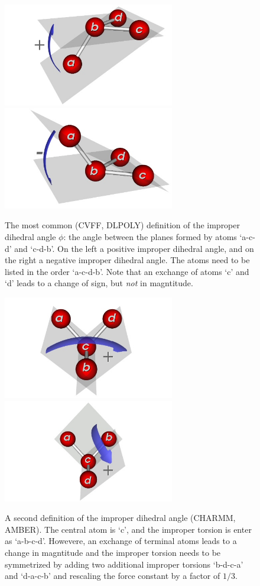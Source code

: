 \begin{figure}[t]
  \centering
  \includegraphics[width=7.5cm]{./Potentials/ImproperTorsionAnglePlus.jpg}
  \includegraphics[width=7.5cm]{./Potentials/ImproperTorsionAngleMinus.jpg}
  \caption{The most common (CVFF, DLPOLY) definition of the improper dihedral angle 
   $\phi$: the angle between the planes formed by atoms `a-c-d' and `c-d-b'.
   On the left a positive improper dihedral angle, and on the right a negative improper dihedral angle.
   The atoms need to be listed in the order `a-c-d-b'. Note that an exchange of atoms `c' and `d' leads to a change
   of sign, but \emph{not} in magntitude.}
  \label{Fig: Improper Torsion definition}
  \includegraphics[width=7.5cm]{./Potentials/ImproperTorsionAngleTypeA.jpg}
  \includegraphics[width=7.5cm]{./Potentials/ImproperTorsionAngleTypeB.jpg}
  \caption{A second definition of the improper dihedral angle (CHARMM, AMBER). The central atom is `c', and the improper torsion
   is enter as `a-b-c-d'. Howevere, an exchange of terminal atoms leads to a change in magntitude and the improper torsion
   needs to be symmetrized by adding two additional improper torsions `b-d-c-a' and `d-a-c-b' and rescaling the force constant
   by a factor of $1/3$.}
\end{figure}

